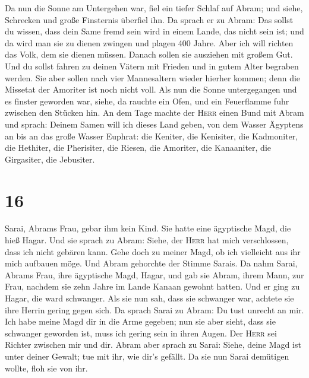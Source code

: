  Da nun die Sonne am Untergehen war, fiel ein tiefer
Schlaf auf Abram; und siehe, Schrecken und große Finsternis überfiel
ihn.  Da sprach er zu Abram: Das sollst du wissen, dass
dein Same fremd sein wird in einem Lande, das nicht sein ist; und da
wird man sie zu dienen zwingen und plagen 400 Jahre. 
Aber ich will richten das Volk, dem sie dienen müssen. Danach sollen sie
ausziehen mit großem Gut.  Und du sollst fahren zu deinen
Vätern mit Frieden und in gutem Alter begraben werden. 
Sie aber sollen nach vier Mannesaltern wieder hierher kommen; denn die
Missetat der Amoriter ist noch nicht voll.  Als nun die
Sonne untergegangen und es finster geworden war, siehe, da rauchte ein
Ofen, und ein Feuerflamme fuhr zwischen den Stücken hin. 
An dem Tage machte der \textsc{Herr} einen Bund mit Abram und sprach:
Deinem Samen will ich dieses Land geben, von dem Wasser Ägyptens an bis
an das große Wasser Euphrat:  die Keniter, die Kenisiter,
die Kadmoniter,  die Hethiter, die Pherisiter, die
Riesen,  die Amoriter, die Kanaaniter, die Girgasiter,
die Jebusiter.

\hypertarget{section-15}{%
\section{16}\label{section-15}}

 Sarai, Abrams Frau, gebar ihm kein Kind. Sie hatte eine
ägyptische Magd, die hieß Hagar.  Und sie sprach zu Abram:
Siehe, der \textsc{Herr} hat mich verschlossen, dass ich nicht gebären
kann. Gehe doch zu meiner Magd, ob ich vielleicht aus ihr mich aufbauen
möge. Und Abram gehorchte der Stimme Sarais.  Da nahm
Sarai, Abrams Frau, ihre ägyptische Magd, Hagar, und gab sie Abram,
ihrem Mann, zur Frau, nachdem sie zehn Jahre im Lande Kanaan gewohnt
hatten.  Und er ging zu Hagar, die ward schwanger. Als sie
nun sah, dass sie schwanger war, achtete sie ihre Herrin gering gegen
sich.  Da sprach Sarai zu Abram: Du tust unrecht an mir.
Ich habe meine Magd dir in die Arme gegeben; nun sie aber sieht, dass
sie schwanger geworden ist, muss ich gering sein in ihren Augen. Der
\textsc{Herr} sei Richter zwischen mir und dir.  Abram
aber sprach zu Sarai: Siehe, deine Magd ist unter deiner Gewalt; tue mit
ihr, wie dir's gefällt. Da sie nun Sarai demütigen wollte, floh sie von
ihr.

